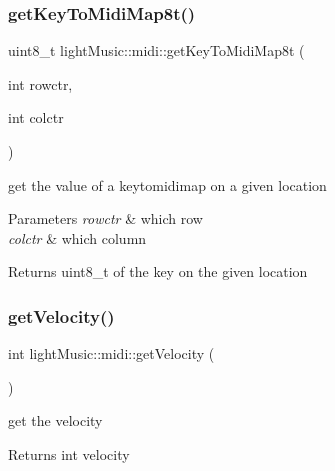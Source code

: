 \subsubsection{\texorpdfstring{get\+Key\+To\+Midi\+Map8t()}{getKeyToMidiMap8t()}}
{\footnotesize\ttfamily uint8\+\_\+t light\+Music\+::midi\+::get\+Key\+To\+Midi\+Map8t (\begin{DoxyParamCaption}\item[{int}]{rowctr,  }\item[{int}]{colctr }\end{DoxyParamCaption})}



get the value of a keytomidimap on a given location 


\begin{DoxyParams}{Parameters}
{\em rowctr} & which row \\
\hline
{\em colctr} & which column \\
\hline
\end{DoxyParams}
\begin{DoxyReturn}{Returns}
uint8\+\_\+t of the key on the given location 
\end{DoxyReturn}
\mbox{\label{classlight_music_1_1midi_aed22201e6c80c8fb8242803e22d71032}} 
\subsubsection{\texorpdfstring{get\+Velocity()}{getVelocity()}}
{\footnotesize\ttfamily int light\+Music\+::midi\+::get\+Velocity (\begin{DoxyParamCaption}{ }\end{DoxyParamCaption})}



get the velocity 

\begin{DoxyReturn}{Returns}
int velocity 
\end{DoxyReturn}
\mbox{\label{classlight_music_1_1midi_ae36edf372f74e28dabe879dc7600494a}} 
